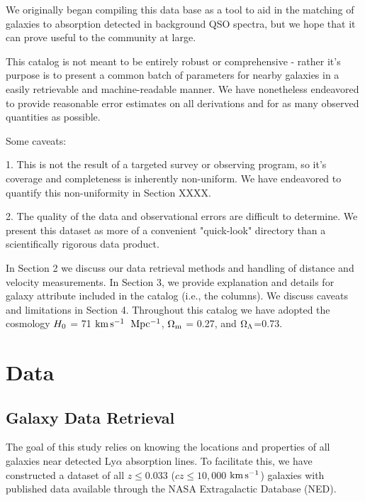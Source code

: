 \documentclass[iop]{emulateapj-rtx4}
\newcommand{\kms}{$\rm km\, s^{-1}$}
\begin{document}
We originally began compiling this data base as a tool to aid in the matching of galaxies to absorption detected in background QSO spectra, but we hope that it can prove useful to the community at large.

This catalog is not meant to be entirely robust or comprehensive - rather it's purpose is to present a common batch of parameters for nearby galaxies in a easily retrievable and machine-readable manner. We have nonetheless endeavored to provide reasonable error estimates on all derivations and for as many observed quantities as possible.


Some caveats:

1. This is not the result of a targeted survey or observing program, so it's coverage and completeness is inherently non-uniform. We have endeavored to quantify this non-uniformity in Section XXXX.

2. The quality of the data and observational errors are difficult to determine. We present this dataset as more of a convenient "quick-look" directory than a scientifically rigorous data product.


%
%

In Section 2 we discuss our data retrieval methods and handling of distance and velocity measurements. In Section 3, we provide explanation and details for galaxy attribute included in the catalog (i.e., the columns). We discuss caveats and limitations in Section 4. Throughout this catalog we have adopted the cosmology $H_{\rm 0}$ = 71 \kms ~$\rm Mpc^{-1}$, $\rm \Omega_m$ = 0.27, and $\rm \Omega_{\Lambda}$=0.73.

\section{Data}

\subsection{Galaxy Data Retrieval}

The goal of this study relies on knowing the locations and properties of all galaxies near detected Ly$\alpha$ absorption lines. To facilitate this, we have constructed a dataset of all $z\leq 0.033$ ($cz\leq 10,000$ \kms) galaxies with published data available through the NASA Extragalactic Database (NED). 
\end{document}
